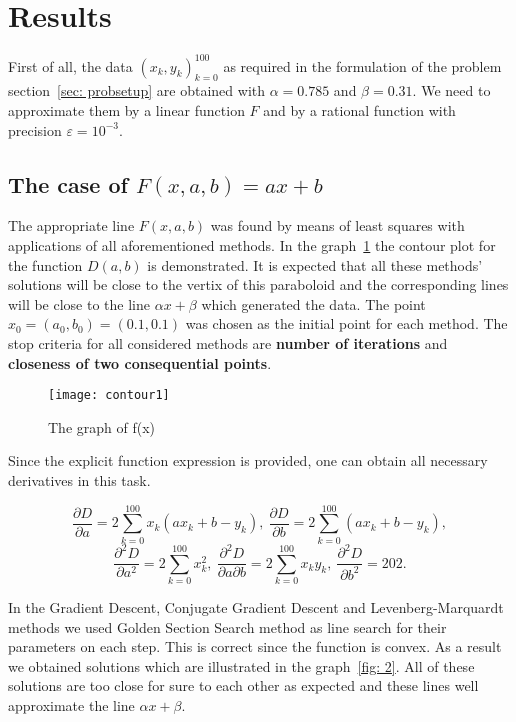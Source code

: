 \documentclass[12pt, bachelor, substylefile = algo_title.rtx]{disser}
\newcommand{\eps}{\varepsilon}
\theoremstyle{definition}
\begin{document}
\section{Results}
First of all, the data $(x_k, y_k)_{k = 0}^{100}$ as required in the formulation of the problem section~\ref{sec: probsetup} are obtained with $\alpha = 0.785$ and $\beta = 0.31$. We need to approximate them by a linear function $F$ and by a rational function with precision $\eps = 10^{-3}$.
\subsection{The case of $F(x, a, b) = ax+b$}
The appropriate line $F(x,a,b)$ was found by means of least squares with applications of all aforementioned methods. In the graph~\ref{fig: 1} the contour plot for the function $D(a,b)$ is demonstrated. It is expected that all these methods' solutions will be close to the vertix of this paraboloid and the corresponding lines will be close to the line $\alpha x + \beta$ which generated the data. The point $x_0 = (a_0, b_0)=(0.1, 0.1)$ was chosen as the initial point for each method. The stop criteria for all considered methods are \textbf{number of iterations} and \textbf{closeness of two consequential points}.

\begin{figure}[h]
\begin{center}
\texttt{[image: contour1]}
\caption{The graph of f(x)}
\label{fig: 1}
\end{center}
\end{figure}

Since the explicit function expression is provided, one can obtain all necessary derivatives in this task.

$$ \frac{\partial D}{\partial a} = 2 \sum_{k=0}^{100}x_k(ax_k+b-y_k),\ \frac{\partial D}{\partial b} = 2\sum_{k=0}^{100}(ax_k+b-y_k), $$
$$ \frac{\partial^2 D}{\partial a^2} = 2\sum_{k=0}^{100}x^2_k,\ \frac{\partial^2 D}{\partial a \partial b} = 2\sum_{k=0}^{100}x_k y_k,\ \frac{\partial^2 D}{\partial b^2} = 202. $$

In the Gradient Descent, Conjugate Gradient Descent and Levenberg-Marquardt methods we used Golden Section Search method as line search for their parameters on each step. This is correct since the function is convex. As a result we obtained solutions which are illustrated in the graph~\ref{fig: 2}. All of these solutions are too close for sure to each other as expected and these lines well approximate the line $\alpha x + \beta$.
\end{document}
